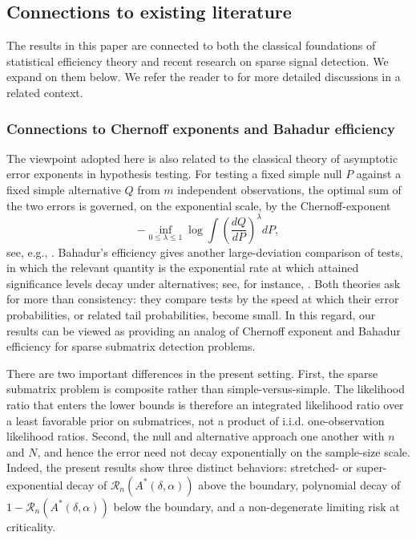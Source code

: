 \documentclass[11pt,reqno,letterpaper]{amsart}
\numberwithin{equation}{section}
\theoremstyle{plain}
\begin{document}
\subsection{Connections to existing literature} The results in this paper are 
connected to both the classical foundations of statistical efficiency theory and 
recent research on sparse signal detection. We expand on them below. We refer the 
reader to \cite[Section~1.4]{mukherjee2020minimax} for more detailed discussions 
in a related context.

\subsubsection{Connections to Chernoff exponents and Bahadur efficiency} The viewpoint adopted here is also related to the classical theory of asymptotic error exponents in hypothesis testing.  For testing a fixed simple null $P$ against a fixed simple alternative $Q$ from $m$ independent observations, the optimal sum of the two errors is governed, on the exponential scale, by the Chernoff-exponent
\begin{equation*}
   -\inf_{0\le \lambda \le1} \log \int \left(\frac{dQ}{dP}\right)^{\lambda} dP,
\end{equation*}
see, e.g., \cite[Corollary~12.1]{polyanskiy2014lecture}. Bahadur's efficiency 
gives another large-deviation comparison of tests, in which the relevant quantity 
is the exponential rate at which attained significance levels decay under 
alternatives; see, for instance, \cite{bahadur1967rates}. Both theories ask for 
more than consistency: they compare tests by the speed at which their error 
probabilities, or related tail probabilities, become small. In this regard, our results can be 
viewed as providing an analog of Chernoff exponent and Bahadur efficiency for sparse 
submatrix detection problems.

There are two important differences in the present setting.  First, the sparse submatrix problem is composite rather than simple-versus-simple.  The likelihood ratio that enters the lower bounds is therefore an integrated likelihood ratio over a least favorable prior on submatrices, not a product of i.i.d. one-observation likelihood ratios. Second, the null and alternative approach one another with $n$ and $N$, and hence the error need not decay exponentially on the sample-size scale.  Indeed, the present results show three distinct behaviors: stretched- or super-exponential decay of $\mathcal R_n(A^\ast(\delta, \alpha))$ above the boundary, polynomial decay of $1-\mathcal R_n(A^\ast(\delta, \alpha))$ below the boundary, and a non-degenerate limiting risk at criticality.
\end{document}
